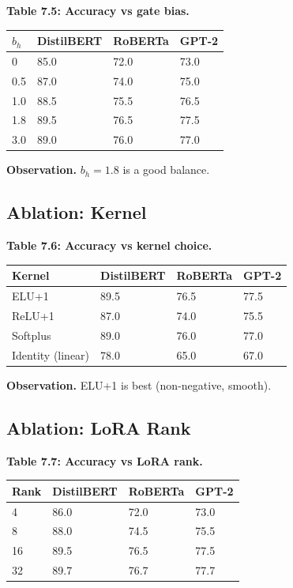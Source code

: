 \textbf{Table 7.5: Accuracy vs gate bias.}

\begin{table}[H]
\centering
\small
\begin{tabular}{llll}
\toprule
\textbf{$b_h$} & \textbf{DistilBERT} & \textbf{RoBERTa} & \textbf{GPT-2} \\
\midrule
0 & 85.0 & 72.0 & 73.0 \\
0.5 & 87.0 & 74.0 & 75.0 \\
1.0 & 88.5 & 75.5 & 76.5 \\
1.8 & 89.5 & 76.5 & 77.5 \\
3.0 & 89.0 & 76.0 & 77.0 \\
\bottomrule
\end{tabular}
\end{table}

\textbf{Observation.} $b_h = 1.8$ is a good balance.

\subsection{Ablation: Kernel}

\textbf{Table 7.6: Accuracy vs kernel choice.}

\begin{table}[H]
\centering
\small
\begin{tabular}{llll}
\toprule
\textbf{Kernel} & \textbf{DistilBERT} & \textbf{RoBERTa} & \textbf{GPT-2} \\
\midrule
ELU+1 & 89.5 & 76.5 & 77.5 \\
ReLU+1 & 87.0 & 74.0 & 75.5 \\
Softplus & 89.0 & 76.0 & 77.0 \\
Identity (linear) & 78.0 & 65.0 & 67.0 \\
\bottomrule
\end{tabular}
\end{table}

\textbf{Observation.} ELU+1 is best (non-negative, smooth).

\subsection{Ablation: LoRA Rank}

\textbf{Table 7.7: Accuracy vs LoRA rank.}

\begin{table}[H]
\centering
\small
\begin{tabular}{llll}
\toprule
\textbf{Rank} & \textbf{DistilBERT} & \textbf{RoBERTa} & \textbf{GPT-2} \\
\midrule
4 & 86.0 & 72.0 & 73.0 \\
8 & 88.0 & 74.5 & 75.5 \\
16 & 89.5 & 76.5 & 77.5 \\
32 & 89.7 & 76.7 & 77.7 \\
\bottomrule
\end{tabular}
\end{table}

